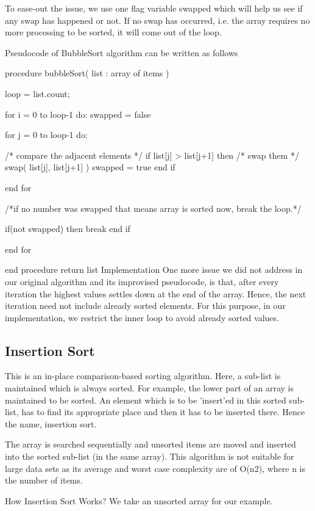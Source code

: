 To ease-out the issue, we use one flag variable swapped which will help us see if any swap has happened or not. If no swap has occurred, i.e. the array requires no more processing to be sorted, it will come out of the loop.

Pseudocode of BubbleSort algorithm can be written as follows

procedure bubbleSort( list : array of items )

   loop = list.count;

   for i = 0 to loop-1 do:
      swapped = false

      for j = 0 to loop-1 do:

         /* compare the adjacent elements */
         if list[j] > list[j+1] then
            /* swap them */
            swap( list[j], list[j+1] )
            swapped = true
         end if

      end for

      /*if no number was swapped that means
      array is sorted now, break the loop.*/

      if(not swapped) then
         break
      end if

   end for

end procedure return list
Implementation
One more issue we did not address in our original algorithm and its improvised pseudocode, is that, after every iteration the highest values settles down at the end of the array. Hence, the next iteration need not include already sorted elements. For this purpose, in our implementation, we restrict the inner loop to avoid already sorted values.

\subsection{Insertion Sort}

This is an in-place comparison-based sorting algorithm. Here, a sub-list is maintained which is always sorted. For example, the lower part of an array is maintained to be sorted. An element which is to be 'insert'ed in this sorted sub-list, has to find its appropriate place and then it has to be inserted there. Hence the name, insertion sort.

The array is searched sequentially and unsorted items are moved and inserted into the sorted sub-list (in the same array). This algorithm is not suitable for large data sets as its average and worst case complexity are of Ο(n2), where n is the number of items.

How Insertion Sort Works?
We take an unsorted array for our example.



